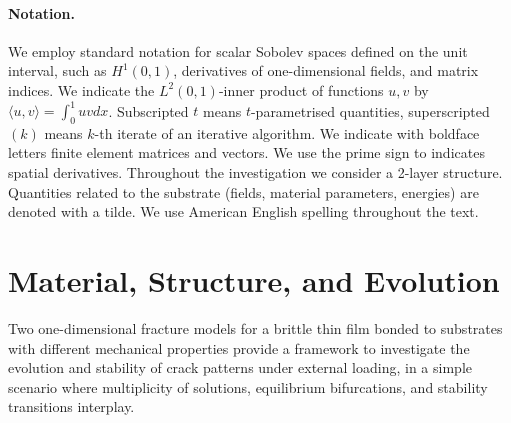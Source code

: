 \documentclass[10pt]{article}
\begin{document}
\paragraph{Notation.} We employ standard notation for scalar Sobolev spaces defined on the unit interval, such as $H^1(0, 1)$, derivatives of one-dimensional fields, and matrix indices. We indicate the $L^2(0, 1)$-inner product of functions $u, v$ by $\langle u, v\rangle=\int_0^1 uv dx$. Subscripted $t$ means $t$-parametrised quantities, superscripted $(k)$ means $k$-th iterate of an iterative algorithm. 
We indicate with boldface letters finite element matrices and vectors. 
We use the prime sign to indicates spatial derivatives. Throughout the investigation we consider a 2-layer structure. Quantities related to the substrate (fields, material parameters, energies) are denoted with a tilde.
We use American English spelling throughout the text.
%
\section{Material, Structure, and Evolution}
\label{sec:rigid}

Two one-dimensional fracture models for a brittle thin film bonded to substrates with different mechanical properties provide a framework to investigate the evolution and stability of crack patterns under external loading, in a  simple scenario where multiplicity of solutions, equilibrium bifurcations, and stability transitions interplay.
\end{document}
